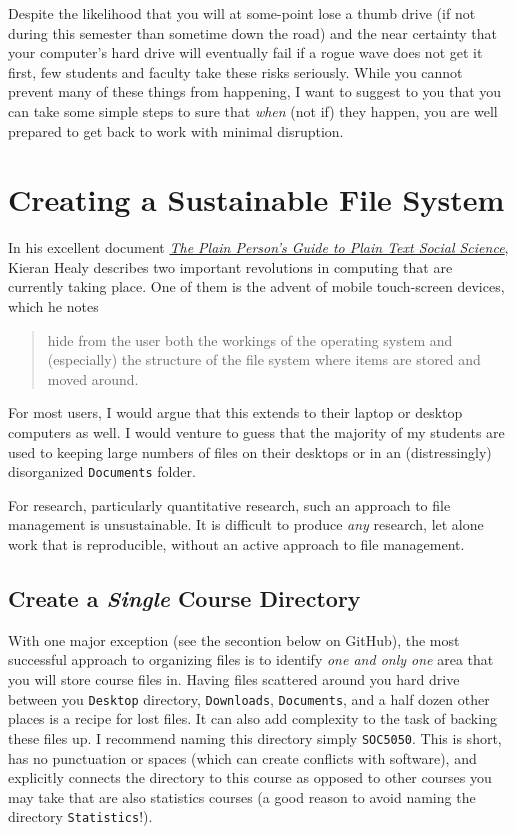 \documentclass[]{book}
\begin{document}
Despite the likelihood that you will at some-point lose a thumb drive
(if not during this semester than sometime down the road) and the near
certainty that your computer's hard drive will eventually fail if a
rogue wave does not get it first, few students and faculty take these
risks seriously. While you cannot prevent many of these things from
happening, I want to suggest to you that you can take some simple steps
to sure that \emph{when} (not if) they happen, you are well prepared to
get back to work with minimal disruption.

\section{Creating a Sustainable File
System}\label{creating-a-sustainable-file-system}

In his excellent document \href{http://plain-text.co}{\emph{The Plain
Person's Guide to Plain Text Social Science}}, Kieran Healy describes
two important revolutions in computing that are currently taking place.
One of them is the advent of mobile touch-screen devices, which he notes

\begin{quote}
hide from the user both the workings of the operating system and
(especially) the structure of the file system where items are stored and
moved around.
\end{quote}

For most users, I would argue that this extends to their laptop or
desktop computers as well. I would venture to guess that the majority of
my students are used to keeping large numbers of files on their desktops
or in an (distressingly) disorganized \texttt{Documents} folder.

For research, particularly quantitative research, such an approach to
file management is unsustainable. It is difficult to produce \emph{any}
research, let alone work that is reproducible, without an active
approach to file management.

\subsection{\texorpdfstring{Create a \emph{Single} Course
Directory}{Create a Single Course Directory}}\label{create-a-single-course-directory}

With one major exception (see the secontion below on GitHub), the most
successful approach to organizing files is to identify \emph{one and
only one} area that you will store course files in. Having files
scattered around you hard drive between you \texttt{Desktop} directory,
\texttt{Downloads}, \texttt{Documents}, and a half dozen other places is
a recipe for lost files. It can also add complexity to the task of
backing these files up. I recommend naming this directory simply
\texttt{SOC5050}. This is short, has no punctuation or spaces (which can
create conflicts with software), and explicitly connects the directory
to this course as opposed to other courses you may take that are also
statistics courses (a good reason to avoid naming the directory
\texttt{Statistics}!).
\end{document}
